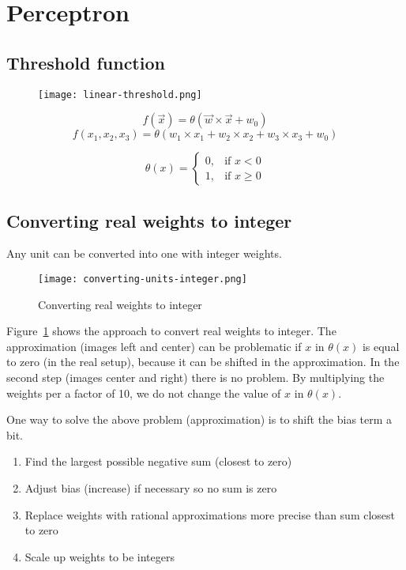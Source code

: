 \documentclass[main]{subfiles}
\begin{document}

\section{Perceptron}

\subsection{Threshold function}

\begin{figure}[H]
	\centering
	\texttt{[image: linear-threshold.png]}
\end{figure}

\[ f(\vec{x}) = \theta(\vec{w} \times \vec{x} + w_0) \]
\[ f(x_1, x_2, x_3) = \theta(w_1 \times x_1 + w_2 \times x_2 + w_3 \times x_3 + w_0) \]

\[
    \theta(x)= 
\begin{cases}
     0, & \text{if } x < 0\\
     1, & \text{if } x \geq 0
\end{cases}
\]

\subsection{Converting real weights to integer}
Any unit can be converted into one with integer weights.

\begin{figure}[H]
	\centering
	\texttt{[image: converting-units-integer.png]}
	\caption{Converting real weights to integer}
	\label{fig:converting}
\end{figure}

Figure~\ref{fig:converting} shows the approach to convert real weights to integer. The approximation (images left and center) can be problematic if $x$ in $\theta(x)$ is equal to zero (in the real setup), because it can be shifted in the approximation.
In the second step (images center and right) there is no problem. By multiplying the weights per a factor of 10, we do not change the value of $x$ in $\theta(x)$.

One way to solve the above problem (approximation) is to shift the bias term a bit.

\begin{enumerate}
\item Find the largest possible negative sum (closest to zero)
\item Adjust bias (increase) if necessary so no sum is zero
\item Replace weights with rational approximations more precise than sum closest to zero
\item Scale up weights to be integers
\end{enumerate}
\end{document}
